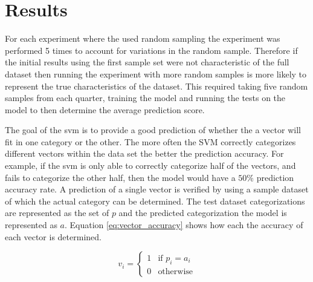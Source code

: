 \section{Results}


For each experiment where the used random sampling the experiment was performed 5 times to account for variations in the random sample. Therefore if the initial results using the first sample set were not characteristic of the full dataset then running the experiment with more random samples is more likely to represent the true characteristics of the dataset. This required taking five random samples from each quarter, training the model and running the tests on the model to then determine the average prediction score.

The goal of the \gls{svm} is to provide a good prediction of whether the a vector will fit in one category or the other. The more often the SVM correctly categorizes different vectors within the data set the better the prediction accuracy. For example, if the \gls{svm} is only able to correctly categorize half of the vectors, and fails to categorize the other half, then the model would have a $50\%$ prediction accuracy rate. A prediction of a single vector is verified by using a sample dataset of which the actual category can be determined. The test dataset categorizations are represented as the set of $p$ and the predicted categorization the model is represented as $a$. Equation \ref{eq:vector_accuracy} shows how each the accuracy of each vector is determined.



\begin{equation} 
\label{eq:vector_accuracy}
v_i = \left\{\begin{matrix}
1 & \text{if } p_i = a_i\\ 
0 & \text{otherwise}
\end{matrix}\right.
\end{equation}

